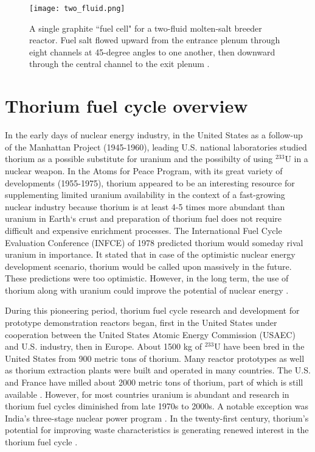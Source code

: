 \begin{figure}[htp!] %
  \centering
  \vspace{-0.3em}
  \texttt{[image: two\_fluid.png]}
  \caption{A single graphite ``fuel cell" for a two-fluid molten-salt breeder reactor. Fuel salt flowed upward from the entrance plenum through eight channels at 45-degree angles to one another, then downward through the central channel to the exit plenum \cite{briggs_molten-salt_1966}.}
  \vspace{-0.6em}
  \label{fig:two_fluid}
\end{figure}
\FloatBarrier

\section{Thorium fuel cycle overview}
In the early days of nuclear energy industry, in the United States as a follow-up of the Manhattan Project (1945-1960), leading U.S. national laboratories studied thorium as a possible substitute for uranium and the possibilty of using $^{233}$U in a nuclear weapon. In the Atoms for Peace Program, with its great variety of developments (1955-1975), thorium appeared to be an interesting resource for supplementing limited uranium availability in the context of a fast-growing nuclear industry because thorium is  at least 4-5 times more abundant than uranium in Earth`s crust and preparation of thorium fuel does not require difficult and expensive enrichment processes. The International Fuel Cycle Evaluation Conference (INFCE) of 1978 predicted thorium would someday rival uranium in importance. It stated that in case of the optimistic nuclear energy development scenario, thorium would be called upon massively in the future. These predictions were too optimistic. However, in the long term, the use of thorium along with uranium could improve the potential of nuclear energy \cite{lung_perspectives_1998}.

During this pioneering period, thorium fuel cycle research and development for prototype demonstration reactors began, first in the United States under cooperation between the United States Atomic Energy Commission (USAEC) and U.S. industry, then in Europe. About 1500 kg of $^{233}$U have been bred in the United States from 900 metric tons of thorium. Many reactor prototypes as well as thorium extraction plants were built and operated in many countries. The U.S. and France have milled about 2000 metric tons of thorium, part of which is still available \cite{lung_perspectives_1998}. However, for most countries uranium is abundant and research in thorium fuel cycles diminished from late 1970s to 2000s. A notable exception was India's three-stage nuclear power program \cite{natarajan_fast_2007}. In the twenty-first century, thorium's potential for improving waste characteristics is generating renewed interest in the thorium fuel cycle \cite{bagla_thorium_2015}.

